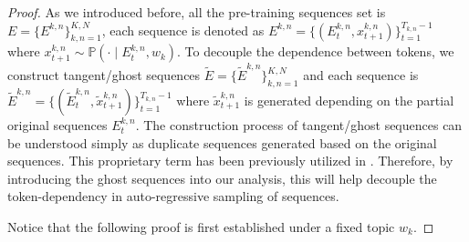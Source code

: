 \begin{proof}
	As we introduced before, all the pre-training sequences set is $E = \{E^{k,n}\}_{k,n=1}^{K,N}$, each sequence is denoted as $E^{k,n}=\{(E^{k,n}_t, x^{k,n}_{t+1})\}_{t=1}^{T_{k,n}-1}$ where $x^{k,n}_{t+1}\sim \mathbb{P}(\cdot \mid E^{k,n}_{t},w_k)$. To decouple the dependence between tokens, we construct tangent/ghost sequences $\tilde{E} = \{\tilde{E}^{k,n}\}_{k,n=1}^{K,N}$ and each sequence is $\tilde{E}^{k,n}=\{(\tilde{E}^{k,n}_t, \tilde{x}^{k,n}_{t+1})\}_{t=1}^{T_{k,n}-1}$ where $\tilde{x}^{k,n}_{t+1}$ is generated depending on the partial original sequences $E^{k,n}_t$. The construction process of tangent/ghost sequences can be understood simply as duplicate sequences generated based on the original sequences. This proprietary term has been previously utilized in \cite{agarwal2020flambe, de1999general, kwapien1991semimartingale}. Therefore, by introducing the ghost sequences into our analysis, this will help decouple the token-dependency in auto-regressive sampling of sequences.
	
	Notice that the following proof is first established under a fixed topic $w_k$.
	

\end{proof}

